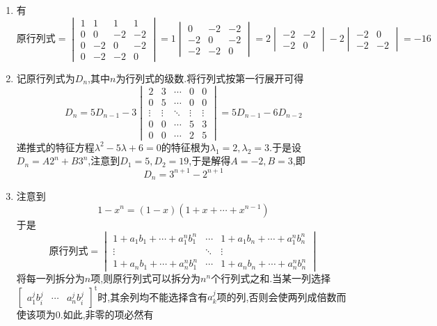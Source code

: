 \documentclass{ctexart}
\begin{document}
\begin{solution}
\begin{enumerate}[label=\tbf{(\arabic*)},topsep=0pt,parsep=0pt,itemsep=0pt,partopsep=0pt]
    \item 有
    \[\text{原行列式}=\begin{vmatrix}
        1&1&1&1\\
        0&0&-2&-2\\
        0&-2&0&-2\\
        0&-2&-2&0
    \end{vmatrix}=1\begin{vmatrix}
        0&-2&-2\\
        -2&0&-2\\
        -2&-2&0
    \end{vmatrix}=2\begin{vmatrix}
        -2&-2\\-2&0
    \end{vmatrix}-2\begin{vmatrix}
        -2&0\\-2&-2
    \end{vmatrix}=-16\]
    \item 记原行列式为$D_n$,其中$n$为行列式的级数.将行列式按第一行展开可得
    \[D_n=5D_{n-1}-3\begin{vmatrix}
        2&3&\cdots&0&0\\
        0&5&\cdots&0&0\\
        \vdots&\vdots&\ddots&\vdots&\vdots\\
        0&0&\cdots&5&3\\
        0&0&\cdots&2&5
    \end{vmatrix}=5D_{n-1}-6D_{n-2}\]
    递推式的特征方程$\lambda^2-5\lambda+6=0$的特征根为$\lambda_1=2,\lambda_2=3$.于是设$D_n=A2^n+B3^n$,注意到$D_1=5,D_2=19$,于是解得$A=-2,B=3$,即
    \[D_n=3^{n+1}-2^{n+1}\]
    \item 注意到
    \[1-x^n=(1-x)(1+x+\cdots+x^{n-1})\]
    于是
    \[\text{原行列式}=\begin{vmatrix}
        1+a_1b_1+\cdots+a_1^nb_1^n&\cdots&1+a_1b_n+\cdots+a_1^nb_n^n\\
        \vdots&\ddots&\vdots\\
        1+a_nb_1+\cdots+a_n^nb_1^n&\cdots&1+a_nb_n+\cdots+a_n^nb_n^n
    \end{vmatrix}\]
    将每一列拆分为$n$项,则原行列式可以拆分为$n^n$个行列式之和.当某一列选择$\begin{bmatrix}
        a_1^jb_i^j&\cdots&a_n^jb_i^j
    \end{bmatrix}^{\text{t}}$时,其余列均不能选择含有$a_k^j$项的列,否则会使两列成倍数而使该项为$0$.如此,非零的项必然有

\end{enumerate}
\end{solution}
\end{document}
